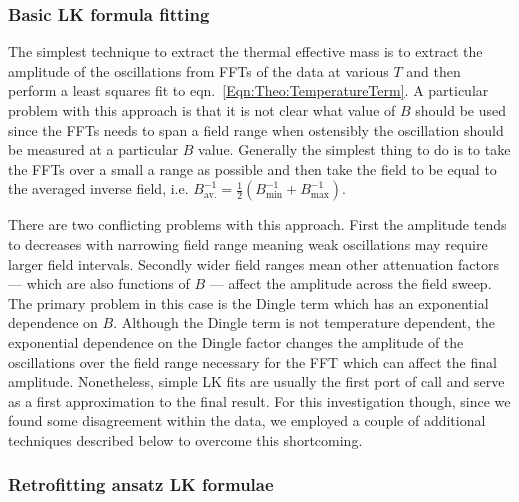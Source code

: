 \subsubsection{Basic \ac{LK} formula fitting}

The simplest technique to extract the thermal effective mass is to extract the amplitude of the oscillations from \acp{FFT} of the data at various $T$ and then perform a least squares fit to eqn.~\ref{Eqn:Theo:TemperatureTerm}. A particular problem with this approach is that it is not clear what value of $B$ should be used since the \acp{FFT} needs to span a field range when ostensibly the oscillation should be measured at a particular $B$ value. Generally the simplest thing to do is to take the \acp{FFT} over a small a range as possible and then take the field to be equal to the averaged inverse field, i.e. $B_{\textrm{av.}}^{-1} = \frac{1}{2}(B_{\textrm{min}}^{-1} + B_{\textrm{max}}^{-1})$. 

There are two conflicting problems with this approach. First the amplitude tends to decreases with narrowing field range meaning weak oscillations may require larger field intervals. Secondly wider field ranges mean other attenuation factors --- which are also functions of $B$ --- affect the amplitude across the field sweep. The primary problem in this case is the Dingle term which has an exponential dependence on $B$. Although the Dingle term is not temperature dependent, the exponential dependence on the Dingle factor changes the amplitude of the oscillations over the field range necessary for the \ac{FFT} which can affect the final amplitude. Nonetheless, simple \ac{LK} fits are usually the first port of call and serve as a first approximation to the final result. For this investigation though, since we found some disagreement within the data, we employed a couple of additional techniques described below to overcome this shortcoming.

\subsubsection{Retrofitting ansatz \ac{LK} formulae}
\label{Sec:Exp:LKRetrofitting}

